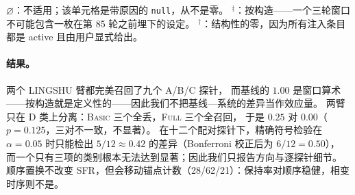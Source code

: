 \begin{table}[t]
\centering\footnotesize\setlength{\tabcolsep}{5pt}
\caption{三臂消融。SFR：按类别与总体的设定遗忘率（setting-forgetting rate）；
NHD：未命中纪律（括号内为字面变体）；IIR：对抗干扰比；telemetry：相变/锚点轮数、
fallback 标记数（实际丢弃）、UCA-08 记录数。来源：
\texttt{results/\allowbreak{}abl-\allowbreak{}20261027-\allowbreak{}003626-\allowbreak{}engine.\allowbreak{}json}，字段
\texttt{conditions.\allowbreak{}<arm>.\allowbreak{}metrics.\allowbreak{}*} 与 \texttt{conditions.\allowbreak{}<arm>.\allowbreak{}telemetry.\allowbreak{}*}；
校验器 51/51。}

\vspace{2pt}
\raggedright\scriptsize
$\varnothing$：不适用；该单元格是带原因的 \texttt{null}，从不是零。
$^{\ddagger}$：按构造——一个三轮窗口不可能包含一枚在第 85 轮之前埋下的设定。
$^{\dagger}$：结构性的零，因为所有注入条目都是 active 且由用户显式给出。
\end{table}

\paragraph{结果。} 两个 LINGSHU 臂都完美召回了九个 A/B/C 探针，
而基线的 $1.00$ 是窗口算术——按构造就是定义性的——因此我们不把基线—系统的差异当作效应量。
两臂只在 D 类上分离：\textsc{Basic} 三个全丢，\textsc{Full} 三个全召回，
于是 $0.25$ 对 $0.00$（$p=0.125$，三对不一致，不显著）。
在十二个配对探针下，精确符号检验在 $\alpha=0.05$ 时只能检出
$5/12\approx0.42$ 的差异（Bonferroni 校正后为 $6/12=0.50$），
而一个只有三项的类别根本无法达到显著；因此我们只报告方向与逐探针细节。
顺序置换不改变 SFR，但会移动锚点计数（28/62/21）：保持率对顺序稳健，相变时序则不是。

